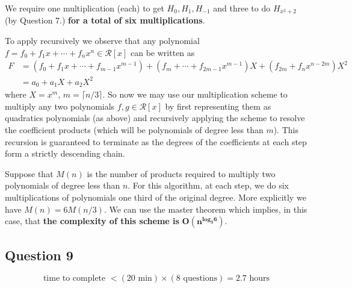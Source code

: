 \documentclass[12pt]{report}
\begin{document}
We require one multiplication (each) to get $H_0, H_1, H_{-1}$ and three to do $H_{x^2+2}$ (by Question 7.) \textbf{for a total of six multiplications}. 

To apply recursively we observe that any polynomial $f  = f_0 + f_1x + \cdots + f_nx^n \in \mathcal{R} [x]$ can be written as
\begin{align*}
F &= (f_0+f_1x+\cdots+f_{m-1}x^{m-1}) +(f_m+\cdots+f_{2m-1}x^{m-1})X+(f_{2m}+f_nx^{n-2m})X^2 \\
&= a_0 + a_1 X + a_2 X^2
\end{align*}
where $X = x^m$, $m = \lceil n / 3 \rceil$. So now we may use our multiplication scheme to multiply any two polynomials $f,g \in \mathcal{R}[x]$ by first representing them as quadratics polynomials (as above) and recursively applying the scheme to resolve the coefficient products (which will be polynomials of degree less than $m$). This recursion is guaranteed to terminate as the degrees of the coefficients at each step form a strictly descending chain.

Suppose that $M(n)$ is the number of products required to multiply two polynomials of degree less than $n$. For this algorithm, at each step, we do six multiplications of polynomials one third of the original degree. More explicitly we have $M(n) = 6M(n/3)$. We can use the master theorem which implies, in this case, that \textbf{the complexity of this scheme is} $\mathbf{O(n^{log_3{6}})}$.

\subsection*{Question 9}
$$ \text{time to complete }< (20\text{ min})\times(8 \text{ questions}) = 2.7 \text{ hours}$$
\end{document}
